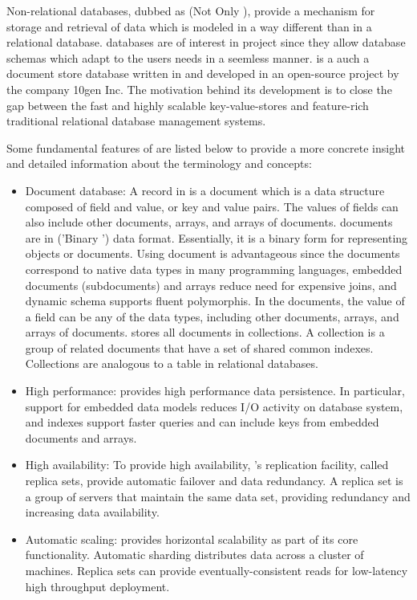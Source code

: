 Non-relational databases, dubbed as {\NoSQL} (Not Only {\SQL}), provide a
mechanism for storage and retrieval of data which is modeled in a way different
than in a relational database.  \cite{nasholm_2012} {\NoSQL} databases are of
interest in {\MoDeNa} project since they allow database schemas which adapt to
the users needs in a seemless manner. {\MongoDB} is a auch a {\NoSQL} document
store database written in {\CPP} and developed in an open-source project by the
company 10gen Inc.  The motivation behind its development is to close the gap
between the fast and highly scalable key-value-stores and feature-rich
traditional relational database management systems.  \cite{shermin_2013}

Some fundamental features of {\MongoDB} are listed below to provide a more
concrete insight and detailed information about the terminology and concepts:
\begin{itemize}
\item Document database: A record in {\MongoDB} is a document which is a data
  structure composed of field and value, or key and value pairs.  The values of
  fields can also include other documents, arrays, and arrays of documents.
  {\MongoDB} documents are in {\BSON} ('Binary {\JSON}') data format.
  Essentially, it is a binary form for representing objects or documents.  Using
  document is advantageous since the documents correspond to native data types
  in many programming languages, embedded documents (subdocuments) and arrays
  reduce need for expensive joins, and dynamic schema supports fluent
  polymorphis.  \cite{MongoDBManual} In the documents, the value of a field can
  be any of the {\BSON} data types, including other documents, arrays, and
  arrays of documents.  {\MongoDB} stores all documents in collections.  A
  collection is a group of related documents that have a set of shared common
  indexes.  Collections are analogous to a table in relational databases.
\item High performance: {\MongoDB} provides high performance data persistence.
  In particular, support for embedded data models reduces I/O activity on
  database system, and indexes support faster queries and can include keys from
  embedded documents and arrays. \cite{MongoDBManual}
\item High availability: To provide high availability, {\MongoDB}'s replication
  facility, called replica sets, provide automatic failover and data redundancy.
  A replica set is a group of {\MongoDB} servers that maintain the same data
  set, providing redundancy and increasing data availability.
  \cite{MongoDBManual}
\item Automatic scaling: {\MongoDB} provides horizontal scalability as part of
  its core functionality.  Automatic sharding distributes data across a cluster
  of machines.  Replica sets can provide eventually-consistent reads for
  low-latency high throughput deployment. \cite{MongoDBManual}
\end{itemize}
